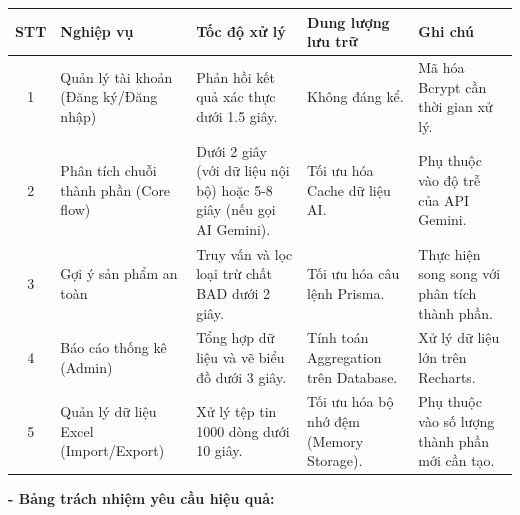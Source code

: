 \documentclass[12pt,a4paper]{article}
\begin{document}
\begin{center}
\renewcommand{\arraystretch}{1.3}
\begin{tabular}{|c|>{\raggedright\arraybackslash}p{3.5cm}|>{\raggedright\arraybackslash}p{4.5cm}|>{\centering\arraybackslash}p{2.5cm}|>{\centering\arraybackslash}p{2.5cm}|}
\hline
\textbf{STT} & \textbf{Nghiệp vụ} & \textbf{Tốc độ xử lý} & \textbf{Dung lượng lưu trữ} & \textbf{Ghi chú} \\ 
\hline

1 & Quản lý tài khoản (Đăng ký/Đăng nhập) 
& Phản hồi kết quả xác thực dưới 1.5 giây. 
& Không đáng kể. 
& Mã hóa Bcrypt cần thời gian xử lý. \\ 
\hline

2 & Phân tích chuỗi thành phần (Core flow) 
& Dưới 2 giây (với dữ liệu nội bộ) hoặc 5-8 giây (nếu gọi AI Gemini). 
& Tối ưu hóa Cache dữ liệu AI. 
& Phụ thuộc vào độ trễ của API Gemini. \\ 
\hline

3 & Gợi ý sản phẩm an toàn 
& Truy vấn và lọc loại trừ chất BAD dưới 2 giây. 
& Tối ưu hóa câu lệnh Prisma. 
& Thực hiện song song với phân tích thành phần. \\ 
\hline

4 & Báo cáo thống kê (Admin) 
& Tổng hợp dữ liệu và vẽ biểu đồ dưới 3 giây. 
& Tính toán Aggregation trên Database. 
& Xử lý dữ liệu lớn trên Recharts. \\ 
\hline

5 & Quản lý dữ liệu Excel (Import/Export) 
& Xử lý tệp tin 1000 dòng dưới 10 giây. 
& Tối ưu hóa bộ nhớ đệm (Memory Storage). 
& Phụ thuộc vào số lượng thành phần mới cần tạo. \\ 
\hline
\end{tabular}
\end{center}

\textbf{- Bảng trách nhiệm yêu cầu hiệu quả:}
\end{document}
